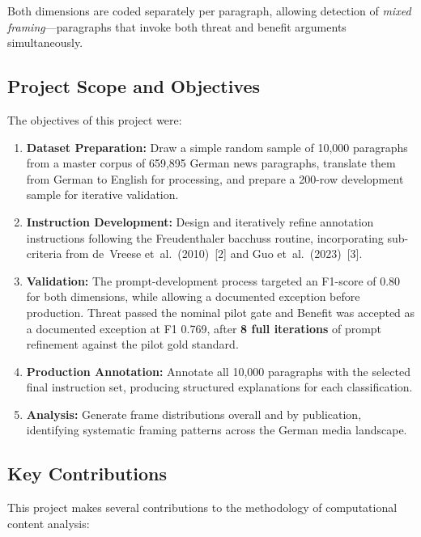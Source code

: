 Both dimensions are coded separately per paragraph, allowing detection of \textit{mixed framing}---paragraphs that invoke both threat and benefit arguments simultaneously.

\subsection{Project Scope and Objectives}

The objectives of this project were:

\begin{enumerate}
    \item \textbf{Dataset Preparation:} Draw a simple random sample of 10,000 paragraphs from a master corpus of 659,895 German news paragraphs, translate them from German to English for processing, and prepare a 200-row development sample for iterative validation.
    
    \item \textbf{Instruction Development:} Design and iteratively refine annotation instructions following the Freudenthaler bacchuss routine, incorporating sub-criteria from de~Vreese et~al.\ (2010)~[2] and Guo et~al.\ (2023)~[3].
    
    \item \textbf{Validation:} The prompt-development process targeted an F1-score of 0.80 for both dimensions, while allowing a documented exception before production. Threat passed the nominal pilot gate and Benefit was accepted as a documented exception at F1 0.769, after \textbf{8 full iterations} of prompt refinement against the pilot gold standard.
    
    \item \textbf{Production Annotation:} Annotate all 10,000 paragraphs with the selected final instruction set, producing structured explanations for each classification.
    
    \item \textbf{Analysis:} Generate frame distributions overall and by publication, identifying systematic framing patterns across the German media landscape.
\end{enumerate}

\subsection{Key Contributions}

This project makes several contributions to the methodology of computational content analysis:

